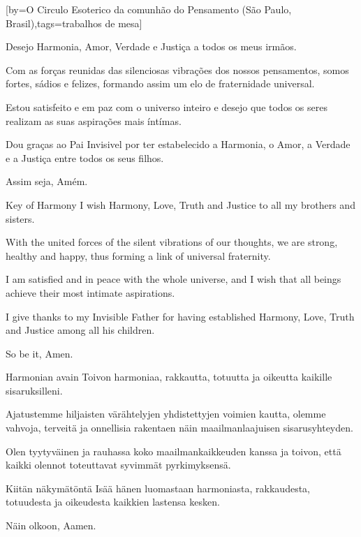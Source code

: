 \sclearpage
{}[by={O Circulo Esoterico da comunhão do Pensamento (São Paulo, Brasil)},tags={trabalhos de mesa}]
  \begin{passage}[PT]{}
    Desejo Harmonia, Amor, Verdade e Justiça a todos os
    meus irmãos.
    \par
    Com as forças reunidas das silenciosas vibrações
    dos nossos pensamentos, somos fortes, sádios e
    felizes, formando assim um elo de fraternidade
    universal.
    \par
    Estou satisfeito e em paz com o universo inteiro
    e desejo que todos os seres realizam as suas
    aspirações mais íntímas.
    \par
    Dou graças ao Pai Invisivel por ter estabelecido
    a Harmonia, o Amor, a Verdade e a Justiça entre
    todos os seus filhos.
    \par
    Assim seja, Amém.
  \end{passage}
  \hardbrk
  \begin{passage}[EN]{Key of Harmony}
    I wish Harmony, Love, Truth and Justice to all my
    brothers and sisters.
    \par
    With the united forces of the silent vibrations
    of our thoughts, we are strong, healthy and happy,
    thus forming a link of universal fraternity.
    \par
    I am satisfied and in peace with the whole
    universe, and I wish that all beings achieve their
    most intimate aspirations.
    \par
    I give thanks to my Invisible Father for having
    established Harmony, Love, Truth and Justice among
    all his children.
    \par
    So be it, Amen.
  \end{passage}
  \begin{passage}[FI]{Harmonian avain}
    Toivon harmoniaa, rakkautta, totuutta ja oikeutta kaikille sisaruksilleni.
    \par
    Ajatustemme hiljaisten värähtelyjen yhdistettyjen voimien kautta, olemme
    vahvoja, terveitä ja onnellisia rakentaen näin maailmanlaajuisen
    sisarusyhteyden.
    \par
    Olen tyytyväinen ja rauhassa koko maailmankaikkeuden kanssa ja toivon,
    että kaikki olennot toteuttavat syvimmät pyrkimyksensä.
    \par
    Kiitän näkymätöntä Isää hänen luomastaan harmoniasta, rakkaudesta,
    totuudesta ja oikeudesta kaikkien lastensa kesken.
    \par
    Näin olkoon, Aamen.
  \end{passage}
\endsong


